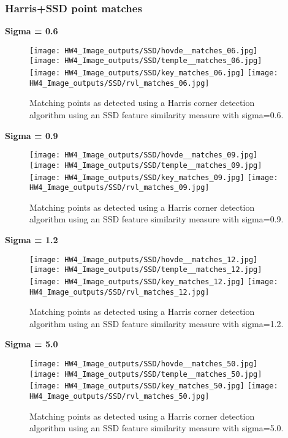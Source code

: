 \documentclass{article}
\begin{document}
\subsubsection{Harris+SSD point matches}
\textbf{Sigma = 0.6}
\begin{figure}[H]
    \centering
    \texttt{[image: HW4\_Image\_outputs/SSD/hovde\_\_matches\_06.jpg]}
    \texttt{[image: HW4\_Image\_outputs/SSD/temple\_\_matches\_06.jpg]}
    \texttt{[image: HW4\_Image\_outputs/SSD/key\_matches\_06.jpg]}
    \texttt{[image: HW4\_Image\_outputs/SSD/rvl\_matches\_06.jpg]}
    \caption{Matching points as detected using a Harris corner detection algorithm using an SSD feature similarity measure with sigma=0.6.}
    \label{fig:ssd-match-06}
\end{figure}
\textbf{Sigma = 0.9}
\begin{figure}[H]
    \centering
    \texttt{[image: HW4\_Image\_outputs/SSD/hovde\_\_matches\_09.jpg]}
    \texttt{[image: HW4\_Image\_outputs/SSD/temple\_\_matches\_09.jpg]}
    \texttt{[image: HW4\_Image\_outputs/SSD/key\_matches\_09.jpg]}
    \texttt{[image: HW4\_Image\_outputs/SSD/rvl\_matches\_09.jpg]}
    \caption{Matching points as detected using a Harris corner detection algorithm using an SSD feature similarity measure with sigma=0.9.}
    \label{fig:ssd-match-09}
\end{figure}
\textbf{Sigma = 1.2}
\begin{figure}[H]
    \centering
    \texttt{[image: HW4\_Image\_outputs/SSD/hovde\_\_matches\_12.jpg]}
    \texttt{[image: HW4\_Image\_outputs/SSD/temple\_\_matches\_12.jpg]}
    \texttt{[image: HW4\_Image\_outputs/SSD/key\_matches\_12.jpg]}
    \texttt{[image: HW4\_Image\_outputs/SSD/rvl\_matches\_12.jpg]}
    \caption{Matching points as detected using a Harris corner detection algorithm using an SSD feature similarity measure with sigma=1.2.}
    \label{fig:ssd-match-12}
\end{figure}
\textbf{Sigma = 5.0}
\begin{figure}[H]
    \centering
    \texttt{[image: HW4\_Image\_outputs/SSD/hovde\_\_matches\_50.jpg]}
    \texttt{[image: HW4\_Image\_outputs/SSD/temple\_\_matches\_50.jpg]}
    \texttt{[image: HW4\_Image\_outputs/SSD/key\_matches\_50.jpg]}
    \texttt{[image: HW4\_Image\_outputs/SSD/rvl\_matches\_50.jpg]}
    \caption{Matching points as detected using a Harris corner detection algorithm using an SSD feature similarity measure with sigma=5.0.}
    \label{fig:ssd-match-50}
\end{figure}
\end{document}
